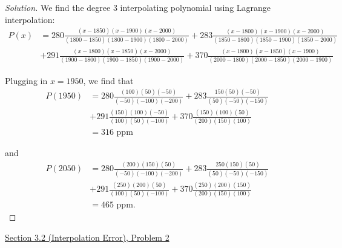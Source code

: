 \documentclass[11pt]{article}
\newenvironment{solution}
  {\renewcommand\qedsymbol{$\blacksquare$}\begin{proof}[Solution]}
  {\end{proof}}
\theoremstyle{definition}
\begin{document}
\begin{solution}
We find the degree $3$ interpolating polynomial using Lagrange interpolation:
\begin{align*} P(x) &= 280 \frac{(x-1850)(x-1900)(x-2000)}{(1800-1850)(1800-1900)(1800-2000)} + 283 \frac{(x-1800)(x-1900)(x-2000)}{(1850-1800)(1850-1900)(1850-2000)} \\
&+ 291 \frac{(x-1800)(x-1850)(x-2000)}{(1900-1800)(1900-1850)(1900-2000)} + 370 \frac{(x-1800)(x-1850)(x-1900)}{(2000-1800)(2000-1850)(2000-1900)}\end{align*}

Plugging in $x=1950$, we find that \begin{align*}
    P(1950) &= 280\frac{(100)(50)(-50)}{(-50) (-100) (-200)} + 283 \frac{150(50)(-50)}{(50)(-50)(-150)} \\
    &+ 291\frac{(150)(100)(-50)}{(100)(50)(-100)} + 370\frac{(150)(100)(50)}{(200)(150)(100)} \\
    &= \boxed{316 \text{ ppm}}
\end{align*}

and \begin{align*}
    P(2050) &= 280\frac{(200)(150)(50)}{(-50) (-100) (-200)} + 283 \frac{250(150)(50)}{(50)(-50)(-150)} \\
    &+ 291\frac{(250)(200)(50)}{(100)(50)(-100)} + 370\frac{(250)(200)(150)}{(200)(150)(100)} \\
    &= \boxed{465 \text{ ppm}}.
\end{align*}
\end{solution}

\newpage

\underline{Section 3.2 (Interpolation Error), Problem 2} \\
\end{document}
